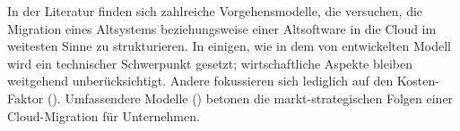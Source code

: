 \begin{comment}
Als SaaS-Vertriebsplattform soll in dieser Arbeit schwerpunktmäßig Salesforce
betrachtet werden, das mit "`AppExchange"' einen Marktplatz zur Verfügung
stellt, auf dem Hersteller ihre auf der Salesforceplattform laufenden
Anwendungen anbieten können. Die Konzentration auf Salesforce als Zielplattform
war zum einen durch das Unternehmen gegeben, mit dem in freundlicher
Kooperation diese Thesis entstanden ist.

\begin{figure}[bh]
\begin{center}
\begin{tikzpicture}
\begin{axis}[
/pgf/number format/.cd,
        use comma,
        1000 sep={},
    title={Umsatz von Salesforce in Mio. US-Dollar},
    xlabel={Jahr},
    ymin=0, ymax=8000,
    legend pos=north west,
    ymajorgrids=true,
    grid style=dashed
]

\addplot[color=blue,mark=square,]
    coordinates {
    (2012,2267)(2013,3050)(2014,4071)(2015,5374)(2016,6667)
    };

\end{axis}
\end{tikzpicture}
\caption{Umsatzzahlen entnommen aus \cite[43]{salesforceannualreport} }
\label{UmsatzzahlenSalesforce}
\end{center}
\end{figure}
Zum anderen aber gehört Salesforce neben Microsoft
und Google zu den größten SaaS-Anbietern
\pcite{}{247}{softwareindustrie2015} und konnte zwischen 2012 und 2016
den Umsatz mit durchschnittlich 31\% von 2,267 Milliarden US-Dollar auf
6,667 Milliarden US-Dollar rasant steigern (Vgl. Abbildung
~\ref{UmsatzzahlenSalesforce}). Daher dürfte es als Zielplattform für
viele Unternehmen eine Option sein.
\end{comment}

In der Literatur finden sich zahlreiche Vorgehensmodelle, die
versuchen, die Migration eines Altsystems beziehungsweise einer Altsoftware
in die Cloud im
weitesten Sinne zu strukturieren. In einigen, wie in dem von
 entwickelten Modell wird
ein technischer Schwerpunkt gesetzt; wirtschaftliche Aspekte bleiben weitgehend
unberücksichtigt. Andere fokussieren sich lediglich auf den Kosten-Faktor
(). Umfassendere Modelle
() betonen die
markt-strategischen Folgen einer Cloud-Migration für Unternehmen.

